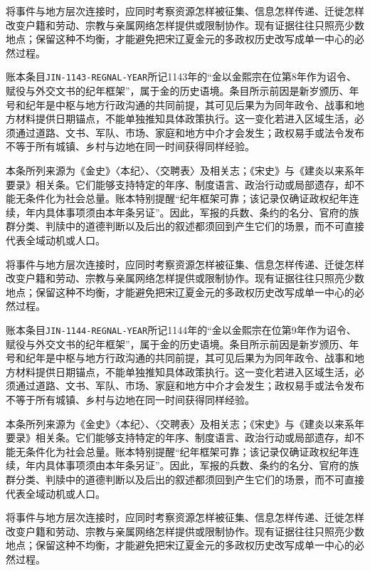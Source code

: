 将事件与地方层次连接时，应同时考察资源怎样被征集、信息怎样传递、迁徙怎样改变户籍和劳动、宗教与亲属网络怎样提供或限制协作。现有证据往往只照亮少数地点；保留这种不均衡，才能避免把宋辽夏金元的多政权历史改写成单一中心的必然过程。

账本条目\texttt{JIN-1143-REGNAL-YEAR}所记1143年的“金以金熙宗在位第8年作为诏令、赋役与外交文书的纪年框架”，属于金的历史语境。条目所示前因是新岁颁历、年号和纪年是中枢与地方行政沟通的共同前提，其可见后果为为同年政令、战事和地方材料提供日期锚点，不能单独推知具体政策执行。这一变化若进入区域生活，必须通过道路、文书、军队、市场、家庭和地方中介才会发生；政权易手或法令发布不等于所有城镇、乡村与边地在同一时间获得同样经验。

本条所列来源为《金史》〈本纪〉、〈交聘表〉及相关志；《宋史》与《建炎以来系年要录》相关条。它们能够支持特定的年序、制度语言、政治行动或局部遗存，却不能无条件化为社会总量。账本特别提醒“纪年框架可靠；该记录仅确证政权纪年连续，年内具体事项须由本年条另证”。因此，军报的兵数、条约的名分、官府的族群分类、判牍中的道德判断以及后出的叙述都须回到产生它们的场景，而不可直接代表全域动机或人口。

将事件与地方层次连接时，应同时考察资源怎样被征集、信息怎样传递、迁徙怎样改变户籍和劳动、宗教与亲属网络怎样提供或限制协作。现有证据往往只照亮少数地点；保留这种不均衡，才能避免把宋辽夏金元的多政权历史改写成单一中心的必然过程。

账本条目\texttt{JIN-1144-REGNAL-YEAR}所记1144年的“金以金熙宗在位第9年作为诏令、赋役与外交文书的纪年框架”，属于金的历史语境。条目所示前因是新岁颁历、年号和纪年是中枢与地方行政沟通的共同前提，其可见后果为为同年政令、战事和地方材料提供日期锚点，不能单独推知具体政策执行。这一变化若进入区域生活，必须通过道路、文书、军队、市场、家庭和地方中介才会发生；政权易手或法令发布不等于所有城镇、乡村与边地在同一时间获得同样经验。

本条所列来源为《金史》〈本纪〉、〈交聘表〉及相关志；《宋史》与《建炎以来系年要录》相关条。它们能够支持特定的年序、制度语言、政治行动或局部遗存，却不能无条件化为社会总量。账本特别提醒“纪年框架可靠；该记录仅确证政权纪年连续，年内具体事项须由本年条另证”。因此，军报的兵数、条约的名分、官府的族群分类、判牍中的道德判断以及后出的叙述都须回到产生它们的场景，而不可直接代表全域动机或人口。

将事件与地方层次连接时，应同时考察资源怎样被征集、信息怎样传递、迁徙怎样改变户籍和劳动、宗教与亲属网络怎样提供或限制协作。现有证据往往只照亮少数地点；保留这种不均衡，才能避免把宋辽夏金元的多政权历史改写成单一中心的必然过程。
